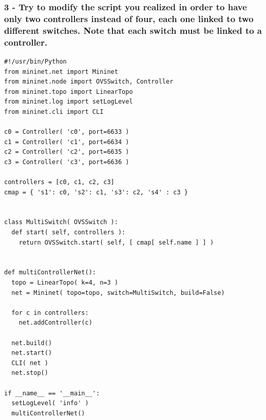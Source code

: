 \hrulefill

\hrulefill

\hrulefill


\subsubsection*{3 - Try to modify the script you realized in order to have only
two controllers instead of four, each one linked to two different switches. Note
that each switch must be linked to a controller. }
\hrulefill

\hrulefill

\hrulefill

\hrulefill







\begin{minipage}{\linewidth}
\begin{lstlisting}[label=lst:activity-2-script, caption=complete Python script required for Activity 2]
#!/usr/bin/Python
from mininet.net import Mininet
from mininet.node import OVSSwitch, Controller
from mininet.topo import LinearTopo
from mininet.log import setLogLevel
from mininet.cli import CLI

c0 = Controller( 'c0', port=6633 )
c1 = Controller( 'c1', port=6634 )
c2 = Controller( 'c2', port=6635 )
c3 = Controller( 'c3', port=6636 )

controllers = [c0, c1, c2, c3]
cmap = { 's1': c0, 's2': c1, 's3': c2, 's4' : c3 }


class MultiSwitch( OVSSwitch ):
  def start( self, controllers ):
    return OVSSwitch.start( self, [ cmap[ self.name ] ] )


def multiControllerNet():
  topo = LinearTopo( k=4, n=3 )
  net = Mininet( topo=topo, switch=MultiSwitch, build=False)

  for c in controllers:
    net.addController(c)

  net.build()
  net.start()
  CLI( net )
  net.stop()

if __name__ == '__main__':
  setLogLevel( 'info' )
  multiControllerNet()
\end{lstlisting}
\end{minipage}
